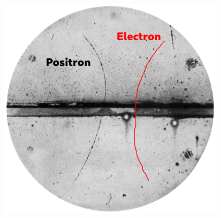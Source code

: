 \documentclass[hyperref={pdfpagelabels=false}]{beamer}
\begin{document}
\begin{frame}[label=]
\frametitle{}
\begin{figure}[H] 
  \centering
\includegraphics[height=0.9\textheight]{../imgs/positron3.png}
\label{fig:positron3png}
  \end{figure}


\end{frame}
\end{document}
